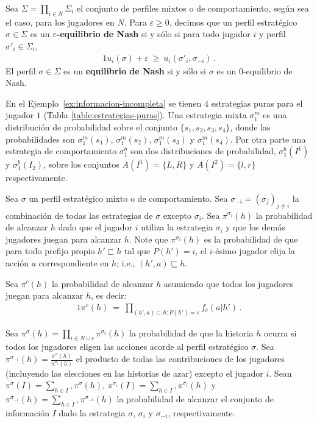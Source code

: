 \begin{definition}
Sea $\Sigma=\prod_{i\in N}\Sigma_i$ el conjunto de perfiles mixtos o de comportamiento, según sea el caso, para los jugadores en $N$.
Para $\varepsilon\geq 0$, decimos que un perfil estratégico $\sigma \in \Sigma$ es un \textbf{$\varepsilon$-equilibrio de Nash} si y sólo si para todo jugador $i$ y perfil $\sigma'_i\in\Sigma_i$,
\begin{alignat}{1}
u_i(\sigma) + \varepsilon\ \geq\ u_i(\sigma'_i, \sigma_{-i}) \,.
\end{alignat}
El perfil $\sigma\in\Sigma$ es un \textbf{equilibrio de Nash} si y sólo si $\sigma$ es un $0$-equilibrio de Nash.
\end{definition}

En el Ejemplo~\ref{ex:informacion-incompleta} se tienen $4$ estrategias puras para el jugador $1$ (Tabla \ref{table:estrategias-puras}). Una estrategia mixta $\sigma^m_1$ es una distribución de probabilidad sobre el conjunto $\{s_1, s_2, s_3, s_4\}$, donde las probabilidades son $\sigma^m_1(s_1)$, $\sigma^m_1(s_2)$, $\sigma^m_1(s_3)$ y $\sigma^m_1(s_4)$. Por otra parte una estrategia de comportamiento $\sigma^b_1$ son dos distribuciones de probabilidad, $\sigma^b_1(I^1)$ y $\sigma^b_1(I_2)$, sobre los conjuntos $A(I^1) = \{L, R\}$ y $A(I^2) = \{l, r\}$ respectivamente.

Sea $\sigma$ un perfil estratégico mixto o de comportamiento. Sea  $\sigma_{-i} = (\sigma_j)_{j \neq i}$ la combinación de todas las estrategias de $\sigma$ excepto $\sigma_i$. Sea $\pi^{\sigma_i}(h)$ la probabilidad de alcanzar $h$ dado que el jugador $i$ utiliza la estrategia $\sigma_i$ y que los demás jugadores juegan para alcanzar $h$. Note que $\pi^{\sigma_i}(h)$ es la probabilidad de que para todo prefijo propio $h' \sqsubset h$ tal que $P(h') = i$, el $i$-ésimo jugador elija la acción $a$ correspondiente en $h$; i.e., $(h', a) \sqsubseteq h$.

Sea $\pi^c(h)$ la probabilidad de alcanzar $h$ asumiendo que todos los jugadores juegan para alcanzar $h$, es decir:
\begin{alignat}{1}
\pi^c(h)\ =\ \prod_{(h', a) \sqsubset h : P(h') = c} f_c(a | h') \, .
\end{alignat}

Sea $\pi^{\sigma}(h) = \prod_{i \in N \cup {c}} \pi^{\sigma_i}(h)$ la probabilidad de que la historia $h$ ocurra si todos los jugadores eligen las acciones acorde al perfil estratégico  $\sigma$.  Sea $\pi^{\sigma_{-i}}(h) = \frac{\pi^{\sigma}(h)}{\pi^{\sigma_{i}}(h)}$ el producto de todas las contribuciones de los jugadores (incluyendo las elecciones en las historias de azar) excepto el jugador $i$. Sean $\pi^{\sigma}(I) = \sum_{h \in I},  \pi^\sigma(h)$, $\pi^{\sigma_i}(I) = \sum_{h \in I},  \pi^{\sigma_i}(h)$ y $\pi^{\sigma_{-i}}(h) = \sum_{h \in I},  \pi^{\sigma_{-i}}(h)$ la probabilidad de alcanzar el conjunto de información $I$ dado la estrategia $\sigma$, $\sigma_{i}$ y $\sigma_{-i}$, respectivamente.

